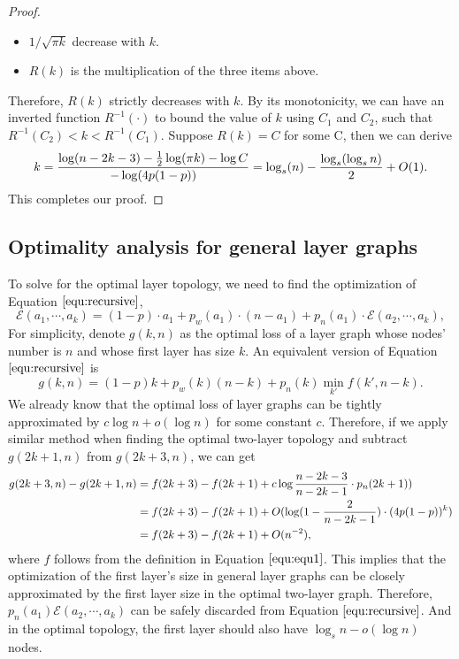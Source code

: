 \documentclass[a4paper,UKenglish]{lipics}
\theoremstyle{definition}
\begin{document}
\begin{proof}
\begin{itemize}
\item $ {1}\Big/{\sqrt{\pi k}} $ decrease with $ k $.
\item $R(k)$ is the multiplication of the three items above.
\end{itemize}
Therefore, $R(k)$ strictly decreases with $k$. 
By its monotonicity, we can have an inverted function $ R^{-1}(\cdot)$ to bound the value of $k$ using $C_1$ and $C_2$, 
	such that $R^{-1}(C_2) < k < R^{-1}(C_1)$. 
Suppose $R(k)=C$ for some C, then we can derive
\begin{equation*}
	k 
= 
	\frac{\log(n-2k-3)-\frac{1}{2}\log(\pi k) - \log C}{-\log(4p(1-p))}
=
	\log_{s}(n)-{\log_s( \log_s n)\over 2} + O(1).
\end{equation*}
This completes our proof.
\end{proof}



\subsection {Optimality analysis for general layer graphs}
\label {subsec:optimality all layers}

To solve for the optimal layer topology, we need to find the optimization of Equation $\ref{equ:recursive}$,
\begin{equation*}
\mathcal{E}(a_1, \dotsb, a_k)
=
(1-p)\cdot a_1 + p_w(a_1)\cdot (n - a_1) + p_n(a_1)\cdot \mathcal{E}(a_2, \dotsb, a_k),
\end{equation*}
For simplicity, denote $g(k, n)$ as the optimal loss of a layer graph whose nodes' number is $n$ and whose first layer has size $k$.
An equivalent version of Equation $\ref{equ:recursive}$ is
\begin{equation*}
g(k, n) = (1-p)k + p_w(k)(n-k) + p_n(k)\min_{k'}f(k',n-k).
\end{equation*}
We already know that the optimal loss of layer graphs can be tightly approximated by $c\log n + o(\log n)$ for some constant $c$.
Therefore, if we apply similar method when finding the optimal two-layer topology and subtract $g(2k+1, n)$ from $g(2k+3, n)$,
	we can get
\begin{align*}
	g(2k+3,n) - g(2k+1,n)
& =
	f(2k+3) - f(2k+1) + c\log {n - 2k - 3 \over n - 2k - 1}\cdot p_n(2k+1) ) \\
& =
	f(2k+3) - f(2k+1) + O( \log (1 - {2 \over n - 2k - 1})\cdot (4p(1-p))^{k}) \\
& =
	f(2k+3) - f(2k+1) + O(n^{-2}),
\end{align*}
where $f$ follows from the definition in Equation $\ref{equ:equ1}$.
This implies that the optimization of the first layer's size in general layer graphs can be closely approximated by
	the first layer size in the optimal two-layer graph.
Therefore, $p_n(a_1)\mathcal{E}(a_2, \dotsb, a_k)$ can be safely discarded from Equation $\ref{equ:recursive}$.
And in the optimal topology, the first layer should also have $\log_{s} n - o(\log n)$ nodes.
\end{document}

